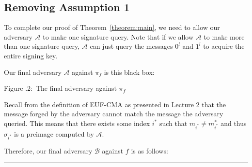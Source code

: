 \documentclass[twoside]{article}
\newcounter{lecnum}
\newcommand{\fig}[3]{
            \vspace{#2}
            \begin{center}
            Figure \thelecnum.#1:~#3
            \end{center}
    }
\newenvironment{proof}{{\bf Proof:}}{\hfill\rule{2mm}{2mm}}
\begin{document}
\subsection{Removing Assumption 1}

To complete our proof of Theorem~\ref{theorem:main}, we need to allow our adversary $\mathcal{A}$ to make one signature query. Note that if we allow $\mathcal{A}$ to make more than one signature query, $\mathcal{A}$ can just query the messages $0^l$ and $1^l$ to acquire the entire signing key.

\begin{proof}
Our final adversary $\mathcal{A}$ against $\pi_f$ is this black box:

\begin{center}
\end{center}
\fig{2}{0in}{The final adversary against $\pi_f$}

Recall from the definition of EUF-CMA as presented in Lecture 2 that the message forged by the adversary cannot match the message the adversary queried. This means that there exists some index $i^*$ such that $m_{i^*} \neq m^*_{i^*}$ and thus $\sigma_{i^*}$ is a preimage computed by $\mathcal{A}$.

Therefore, our final adversary $\mathcal{B}$ against $f$ is as follows:


\end{proof}
\end{document}
